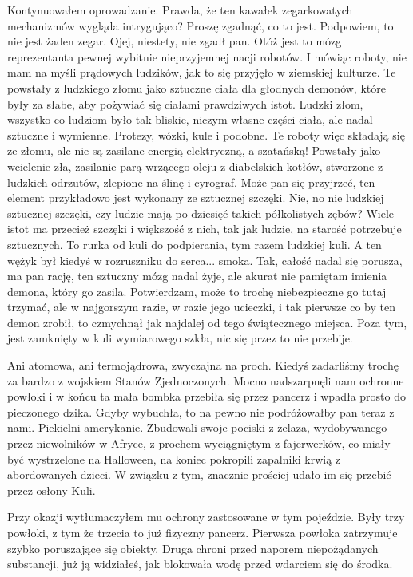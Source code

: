 
Kontynuowałem oprowadzanie.
Prawda, że ten kawałek zegarkowatych mechanizmów wygląda intrygująco? 
Proszę zgadnąć, co to jest. Podpowiem, to nie jest żaden zegar.
Ojej, niestety, nie zgadł pan.
Otóż jest to mózg reprezentanta pewnej wybitnie nieprzyjemnej nacji robotów.
I mówiąc roboty, nie mam na myśli prądowych ludzików, jak to się przyjęło w ziemskiej kulturze.
Te powstały z ludzkiego złomu jako sztuczne ciała dla głodnych demonów, które były za słabe, aby pożywiać się ciałami prawdziwych istot.
Ludzki złom, wszystko co ludziom było tak bliskie, niczym własne części ciała, ale nadal sztuczne i wymienne. Protezy, wózki, kule i podobne.
Te roboty więc składają się ze złomu, ale nie są zasilane energią elektryczną, a szatańską!
Powstały jako wcielenie zła, zasilanie parą wrzącego oleju z diabelskich kotłów, stworzone z ludzkich odrzutów, zlepione na ślinę i cyrograf.
Może pan się przyjrzeć, ten element przykładowo jest wykonany ze sztucznej szczęki.
Nie, no nie ludzkiej sztucznej szczęki, czy ludzie mają po dziesięć takich półkolistych zębów?
Wiele istot ma przecież szczęki i większość z nich, tak jak ludzie, na starość potrzebuje sztucznych.
To rurka od kuli do podpierania, tym razem ludzkiej kuli. A ten wężyk był kiedyś w rozruszniku do serca... smoka.
Tak, całość nadal się porusza, ma pan rację, ten sztuczny mózg nadal żyje, ale akurat nie pamiętam imienia demona, który go zasila.
Potwierdzam, może to trochę niebezpieczne go tutaj trzymać, ale w najgorszym razie, w razie jego ucieczki, i tak pierwsze co by ten demon zrobił, to czmychnął jak najdalej od tego świątecznego miejsca. Poza tym, jest zamknięty w kuli wymiarowego szkła, nic się przez to nie przebije.

Ani atomowa, ani termojądrowa, zwyczajna na proch. Kiedyś zadarliśmy trochę za bardzo z wojskiem Stanów Zjednoczonych. 
Mocno nadszarpnęli nam ochronne powłoki i w końcu ta mała bombka przebiła się przez pancerz i wpadła prosto do pieczonego dzika.
Gdyby wybuchła, to na pewno nie podróżowałby pan teraz z nami.
Piekielni amerykanie. Zbudowali swoje pociski z żelaza, wydobywanego przez niewolników w Afryce,
z prochem wyciągniętym z fajerwerków, co miały być wystrzelone na Halloween, na koniec pokropili zapalniki krwią z abordowanych dzieci.
W związku z tym, znacznie prościej udało im się przebić przez osłony Kuli.

Przy okazji wytłumaczyłem mu ochrony zastosowane w tym pojeździe. Były trzy powłoki, z tym że trzecia to już fizyczny pancerz. 
Pierwsza powłoka zatrzymuje szybko poruszające się obiekty.
Druga chroni przed naporem niepożądanych substancji, już ją widziałeś, jak blokowała wodę przed wdarciem się do środka.

